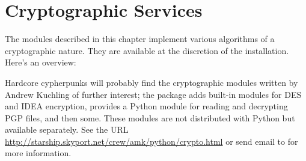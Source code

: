 \chapter{Cryptographic Services}
\label{crypto}

The modules described in this chapter implement various algorithms of
a cryptographic nature.  They are available at the discretion of the
installation.  Here's an overview:

\localmoduletable

Hardcore cypherpunks will probably find the cryptographic modules
written by Andrew Kuchling of further interest; the package adds
built-in modules for DES and IDEA encryption, provides a Python module
for reading and decrypting PGP files, and then some.  These modules
are not distributed with Python but available separately.  See the URL
\url{http://starship.skyport.net/crew/amk/python/crypto.html} or
send email to  for more information.
